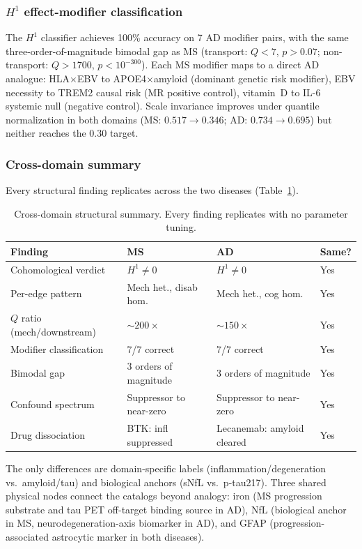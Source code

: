 \documentclass{article}
\begin{document}
\subsubsection{$H^1$ effect-modifier classification}

The $H^1$ classifier achieves 100\% accuracy on 7 AD modifier pairs, with the same three-order-of-magnitude bimodal gap as MS (transport: $Q < 7$, $p > 0.07$; non-transport: $Q > 1700$, $p < 10^{-300}$).
Each MS modifier maps to a direct AD analogue: HLA$\times$EBV to APOE4$\times$amyloid (dominant genetic risk modifier), EBV necessity to TREM2 causal risk (MR positive control), vitamin~D to IL-6 systemic null (negative control).
Scale invariance improves under quantile normalization in both domains (MS: $0.517 \to 0.346$; AD: $0.734 \to 0.695$) but neither reaches the $0.30$ target.

\subsubsection{Cross-domain summary}

Every structural finding replicates across the two diseases (Table~\ref{tab:cross-summary}).

\begin{table}[t]
\centering
\caption{Cross-domain structural summary. Every finding replicates with no parameter tuning.}
\label{tab:cross-summary}
\small
\begin{tabular}{@{}llll@{}}
\toprule
\textbf{Finding} & \textbf{MS} & \textbf{AD} & \textbf{Same?} \\
\midrule
Cohomological verdict & $H^1 \neq 0$ & $H^1 \neq 0$ & Yes \\
Per-edge pattern & Mech het., disab hom. & Mech het., cog hom. & Yes \\
$Q$ ratio (mech/downstream) & $\sim\!200\times$ & $\sim\!150\times$ & Yes \\
Modifier classification & 7/7 correct & 7/7 correct & Yes \\
Bimodal gap & 3 orders of magnitude & 3 orders of magnitude & Yes \\
Confound spectrum & Suppressor to near-zero & Suppressor to near-zero & Yes \\
Drug dissociation & BTK: infl suppressed & Lecanemab: amyloid cleared & Yes \\
\bottomrule
\end{tabular}
\end{table}

The only differences are domain-specific labels (inflammation/degeneration vs.\ amyloid/tau) and biological anchors (sNfL vs.\ p-tau217).
Three shared physical nodes connect the catalogs beyond analogy: iron (MS progression substrate and tau PET off-target binding source in AD), NfL (biological anchor in MS, neurodegeneration-axis biomarker in AD), and GFAP (progression-associated astrocytic marker in both diseases).
\end{document}
